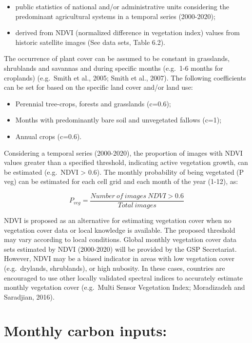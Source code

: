 \documentclass[
  10pt,
  b5paper,
]{book}
\providecommand{\tightlist}{%
  \setlength{\itemsep}{0pt}\setlength{\parskip}{0pt}}
\begin{document}
\begin{itemize}
\tightlist
\item
  public statistics of national and/or administrative units considering the predominant agricultural systems in a temporal series (2000-2020);
\item
  derived from NDVI (normalized difference in vegetation index) values from historic satellite images (See data sets, Table 6.2).
\end{itemize}

The occurrence of plant cover can be assumed to be constant in grasslands, shrublands and savannas and during specific months (e.g.~1-6 months for croplands) (e.g.~Smith et al., 2005; Smith et al., 2007). The following coefficients can be set for based on the specific land cover and/or land use:

\begin{itemize}
\tightlist
\item
  Perennial tree-crops, forests and grasslands (c=0.6);
\item
  Months with predominantly bare soil and unvegetated fallows (c=1);
\item
  Annual crops (c=0.6).
\end{itemize}

Considering a temporal series (2000-2020), the proportion of images with NDVI values greater than a specified threshold, indicating active vegetation growth, can be estimated (e.g.~NDVI \textgreater{} 0.6). The monthly probability of being vegetated (P veg) can be estimated for each cell grid and each month of the year (1-12), as:

\begin{equation}
\tag{6.3}
P_{veg} = \frac{Number\ of \ images \ NDVI > 0.6}{Total \ images}  
\end{equation}

NDVI is proposed as an alternative for estimating vegetation cover when no vegetation cover data or local knowledge is available. The proposed threshold may vary according to local conditions. Global monthly vegetation cover data sets estimated by NDVI (2000-2020) will be provided by the GSP Secretariat. However, NDVI may be a biased indicator in areas with low vegetation cover (e.g.~drylands, shrublands), or high nubosity. In these cases, countries are encouraged to use other locally validated spectral indices to accurately estimate monthly vegetation cover (e.g.~Multi Sensor Vegetation Index; Moradizadeh and Saradjian, 2016).

\hypertarget{monthly-carbon-inputs}{%
\section{Monthly carbon inputs:}\label{monthly-carbon-inputs}}
\end{document}
